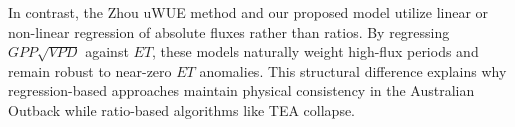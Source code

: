 In contrast, the Zhou uWUE method \citep{zhou2016} and our proposed model utilize linear or non-linear regression of absolute fluxes rather than ratios. By regressing $GPP \sqrt{VPD}$ against $ET$, these models naturally weight high-flux periods and remain robust to near-zero $ET$ anomalies. This structural difference explains why regression-based approaches maintain physical consistency in the Australian Outback while ratio-based algorithms like TEA collapse.
